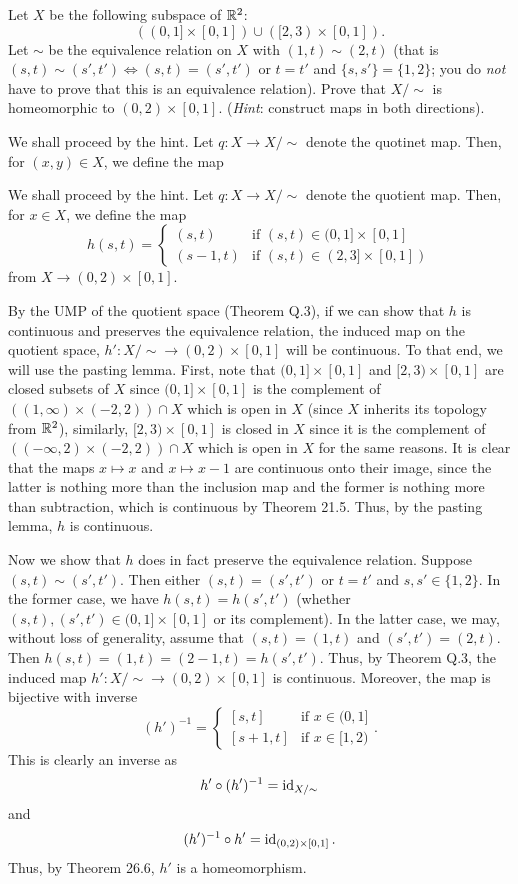 \begin{problem}
Let $X$ be the following subspace of $\mathbb{R}^2$:
\[
((0,1]\times[0,1])\cup([2,3)\times[0,1]).
\]
Let $\sim$ be the equivalence relation on $X$ with $(1,t)\sim(2,t)$ (that
is $(s,t)\sim(s',t')\iff(s,t)=(s',t')$ or $t=t'$ and $\{s,s'\}=\{1,2\}$;
you do \emph{not} have to prove that this is an equivalence
relation). Prove that $X/{\sim}$ is homeomorphic to
$(0,2)\times[0,1]$. (\emph{Hint}: construct maps in both directions).
\end{problem}
\begin{solution}
We shall proceed by the hint. Let $q\colon X\to X/{\sim}$ denote the
quotinet map. Then, for $(x,y)\in X$, we define the map

We shall proceed by the hint. Let $q\colon X\to X/{\sim}$ denote the
quotient map. Then, for $x\in X$, we define the map
\[
h(s,t)=
\begin{cases}
(s,t)&\text{if $(s,t)\in(0,1]\times[0,1]$}\\
(s-1,t)&\text{if $(s,t)\in(2,3]\times[0,1])$}
\end{cases}
\]
from $X\to(0,2)\times[0,1]$.

By the UMP of the quotient space (Theorem Q.3), if we can show that $h$ is
continuous and preserves the equivalence relation, the induced map on the
quotient space, $h'\colon X/{\sim}\to (0,2)\times[0,1]$ will be
continuous. To that end, we will use the pasting lemma. First, note that
$(0,1]\times[0,1]$ and $[2,3)\times[0,1]$ are closed subsets of $X$ since
$(0,1]\times[0,1]$ is the complement of $((1,\infty)\times (-2,2))\cap X$
which is open in $X$ (since $X$ inherits its topology from $\mathbb{R}^2$),
similarly, $[2,3)\times[0,1]$ is closed in $X$ since it is the complement
of $((-\infty,2)\times(-2,2))\cap X$ which is open in $X$ for the same
reasons. It is clear that the maps $x\mapsto x$ and $x\mapsto x-1$ are
continuous onto their image, since the latter is nothing more than the
inclusion map and the former is nothing more than subtraction, which is
continuous by Theorem 21.5. Thus, by the pasting lemma, $h$ is continuous.

Now we show that $h$ does in fact preserve the equivalence
relation. Suppose $(s,t)\sim(s',t')$. Then either $(s,t)=(s',t')$ or $t=t'$
and $s,s'\in\{1,2\}$. In the former case, we have $h(s,t)=h(s',t')$
(whether $(s,t),(s',t')\in(0,1]\times[0,1]$ or its complement). In the
latter case, we may, without loss of generality, assume that $(s,t)=(1,t)$
and $(s',t')=(2,t)$. Then $h(s,t)=(1,t)=(2-1,t)=h(s',t')$. Thus, by Theorem
Q.3, the induced map $h'\colon X/{\sim}\to(0,2)\times[0,1]$ is
continuous. Moreover, the map is bijective with inverse
\[
(h')^{-1}=
\begin{cases}
[s,t]&\text{if $x\in (0,1]$}\\
[s+1,t]&\text{if $x\in [1,2)$}
\end{cases}.
\]
This is clearly an inverse as
\[
h'\circ (h')^{-1}=\operatorname{id}_{X/{\sim}}
\]
and
\[
(h')^{-1}\circ h'=\operatorname{id}_{(0,2)\times[0,1]}.
\]
Thus, by Theorem 26.6, $h'$ is a homeomorphism.
\end{solution}

